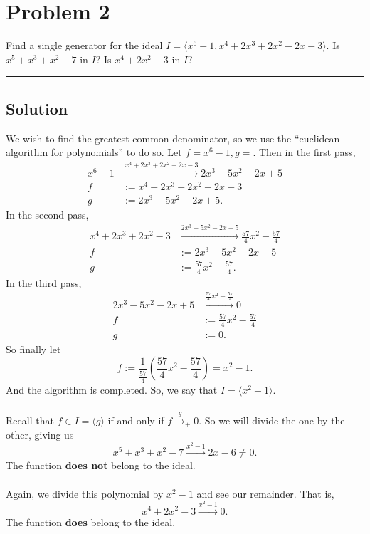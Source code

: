 \documentclass{article}
\theoremstyle{definition}
\begin{document}
\section*{Problem 2}
Find a single generator for the ideal $I = \langle x^6 - 1, x^4 + 2x^3 + 2x^2 -2x -3\rangle$.
Is $x^5 + x^3 + x^2 - 7$ in $I$? Is $x^4 + 2x^2 - 3$ in $I$?
\\
\par\noindent\rule{\textwidth}{0.4pt}
\subsection*{Solution}
We wish to find the greatest common denominator, so we use the ``euclidean algorithm for polynomials'' to do so.
Let $f = x^6 - 1, g = $. Then in the first pass,
\begin{align*}
    x^6 - 1 & \xrightarrow{x^4 + 2x^3 + 2x^2 - 2x - 3} 2x^3 - 5x^2 - 2x +5 \\
    f &:=x^4 + 2x^3 + 2x^2 - 2x - 3 \\
    g &:= 2x^3 - 5x^2 - 2x +5
.\end{align*}
In the second pass,
\begin{align*}
    x^4 + 2x^3 + 2x^2 - 3 &\xrightarrow{ 2x^3 - 5x^2 - 2x +5} \frac{57}{4}x^2 - \frac{57}{4} \\
    f &:= 2x^3 - 5x^2 - 2x +5 \\
    g &:= \frac{57}{4}x^2 - \frac{57}{4} 
.\end{align*}
In the third pass,
\begin{align*}
    2x^3 - 5x^2 - 2x +5 &\xrightarrow{\frac{57}{4}x^2 - \frac{57}{4}} 0 \\
    f &:= \frac{57}{4}x^2 - \frac{57}{4} \\
    g &:= 0
.\end{align*}
So finally let 
\[
    f := \frac{1}{\frac{57}{4}}\left(\frac{57}{4}x^2 - \frac{57}{4}\right) = x^2 - 1
.\]
And the algorithm is completed. So, we say that $I = \langle x^2 - 1 \rangle$. \\\\
Recall that $f \in I = \langle g\rangle$ if and only if $f \xrightarrow{g}_+ 0$.
So we will divide the one by the other, giving us 
\[
    x^5 + x^3 + x^2 - 7 \xrightarrow{x^2 - 1} 2x - 6 \neq 0
.\]
The function \textbf{does not} belong to the ideal.\\\\
 Again, we divide this polynomial by $x^2 - 1$ and see our 
remainder. That is,
\[
    x^4 + 2x^2 - 3 \xrightarrow{x^2 - 1} 0  
.\]
The function \textbf{does} belong to the ideal.
\end{document}
